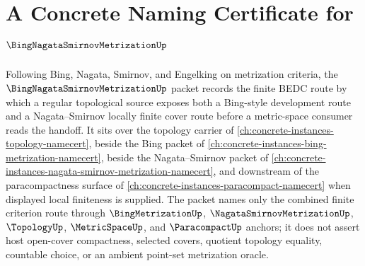 \chapter{A Concrete Naming Certificate for $\BingNagataSmirnovMetrizationUp$}
\label{ch:concrete-instances-bing-nagata-smirnov-metrization-namecert}

Following Bing, Nagata, Smirnov, and Engelking on metrization criteria, the $\BingNagataSmirnovMetrizationUp$ packet records the finite BEDC route by which a regular topological source exposes both a Bing-style development route and a Nagata--Smirnov locally finite cover route before a metric-space consumer reads the handoff. It sits over the topology carrier of \autoref{ch:concrete-instances-topology-namecert}, beside the Bing packet of \autoref{ch:concrete-instances-bing-metrization-namecert}, beside the Nagata--Smirnov packet of \autoref{ch:concrete-instances-nagata-smirnov-metrization-namecert}, and downstream of the paracompactness surface of \autoref{ch:concrete-instances-paracompact-namecert} when displayed local finiteness is supplied. The packet names only the combined finite criterion route through $\BingMetrizationUp$, $\NagataSmirnovMetrizationUp$, $\TopologyUp$, $\MetricSpaceUp$, and $\ParacompactUp$ anchors; it does not assert host open-cover compactness, selected covers, quotient topology equality, countable choice, or an ambient point-set metrization oracle.

